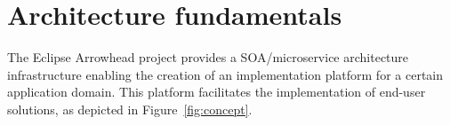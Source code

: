 \documentclass[a4paper]{arrowhead}
\begin{document}




\section{Architecture fundamentals}

The Eclipse Arrowhead project provides a SOA/microservice architecture infrastructure enabling
the creation of an implementation platform for a certain application domain. This platform
facilitates the implementation of end-user solutions, as depicted in Figure~\ref{fig:concept}.
\end{document}
